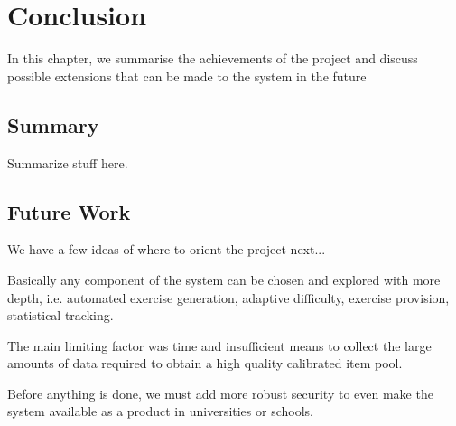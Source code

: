 \chapter{Conclusion}
In this chapter, we summarise the achievements of the project and discuss possible extensions that can be made to the system in the future

\section{Summary}
Summarize stuff here.

\section{Future Work}
\label{sec:future-work}
We have a few ideas of where to orient the project next...\newline

Basically any component of the system can be chosen and explored with more depth, i.e. automated exercise generation, adaptive difficulty, exercise provision, statistical tracking.

The main limiting factor was time and insufficient means to collect the large amounts of data required to obtain a high quality calibrated item pool.

Before anything is done, we must add more robust security to even make the system available as a product in universities or schools.

